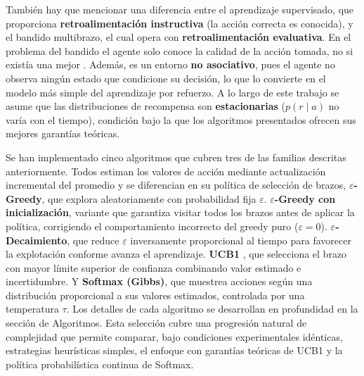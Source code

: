 También hay que mencionar una diferencia entre el aprendizaje supervisado, que proporciona \textbf{retroalimentación instructiva} (la acción correcta es conocida), y el bandido multibrazo, el cual opera con \textbf{retroalimentación evaluativa}. En el problema del bandido el agente solo conoce la calidad de la acción tomada, no si existía una mejor \cite{sutton2018}. Además, es un entorno \textbf{no asociativo}, pues el agente no observa ningún estado que condicione su decisión, lo que lo convierte en el modelo más simple del aprendizaje por refuerzo. A lo largo de este trabajo se asume que las distribuciones de recompensa son \textbf{estacionarias} ($p(r \mid a)$ no varía con el tiempo), condición bajo la que los algoritmos presentados ofrecen sus mejores garantías teóricas.

Se han implementado cinco algoritmos que cubren tres de las familias descritas anteriormente. Todos estiman los valores de acción mediante actualización incremental del promedio y se diferencian en su política de selección de brazos, \textbf{$\varepsilon$-Greedy}, que explora aleatoriamente con probabilidad fija $\varepsilon$. \textbf{$\varepsilon$-Greedy con inicialización}, variante que garantiza visitar todos los brazos antes de aplicar la política, corrigiendo el comportamiento incorrecto del greedy puro ($\varepsilon = 0$). \textbf{$\varepsilon$-Decaimiento}, que reduce $\varepsilon$ inversamente proporcional al tiempo para favorecer la explotación conforme avanza el aprendizaje. \textbf{UCB1} \cite{auer2002}, que selecciona el brazo con mayor límite superior de confianza combinando valor estimado e incertidumbre. Y \textbf{Softmax (Gibbs)}, que muestrea acciones según una distribución proporcional a sus valores estimados, controlada por una temperatura $\tau$. Los detalles de cada algoritmo se desarrollan en profundidad en la sección de Algoritmos. Esta selección cubre una progresión natural de complejidad que permite comparar, bajo condiciones experimentales idénticas, estrategias heurísticas simples, el enfoque con garantías teóricas de UCB1 y la política probabilística continua de Softmax.






